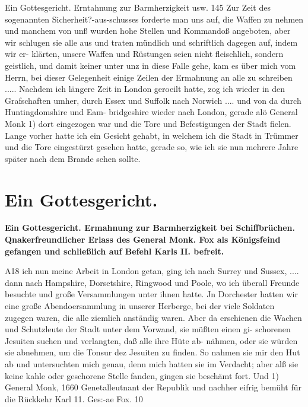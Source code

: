 Ein Gottesgericht. Erntahnung zur Barmherzigkeit usw. 145
Zur Zeit des sogenannten Sicherheit?-aus-schusses forderte man uns
auf, die Waffen zu nehmen und manchem von unß wurden hohe
Stellen und Kommandoß angeboten, aber wir schlugen sie alle aus
und traten mündlich und schriftlich dagegen auf, indem wir er-
klärten, unsere Waffen und Rüstungen seien nicht fleischlich, sondern
geistlich, und damit keiner unter unz in diese Falle gehe, kam es
über mich vom Herrn, bei dieser Gelegenheit einige Zeilen der
Ermahnung an alle zu schreiben .....
Nachdem ich längere Zeit in London geroeilt hatte, zog ich
wieder in den Grafschaften umher, durch Essex und Suffolk nach
Norwich .... und von da durch Huntingdomshire und Eam-
bridgeshire wieder nach London, gerade alö General Monk 1) dort
eingezogen war und die Tore und Befestigungen der Stadt
fielen. Lange vorher hatte ich ein Gesicht gehabt, in welchem
ich die Stadt in Trümmer und die Tore eingestürzt gesehen
hatte, gerade so, wie ich sie nun mehrere Jahre später nach dem
Brande sehen sollte.


\chapter[Ein Gottesgericht.]{Ein Gottesgericht.}

\begin{center}
\textbf{Ein Gottesgericht. Ermahnung zur Barmherzigkeit bei 
Schiffbrüchen. Qnakerfreundlicher Erlass des General Monk. 
Fox als Königsfeind
gefangen und schließlich auf Befehl Karls II. befreit.}
\end{center}


A18 ich nun meine Arbeit in London getan, ging ich nach
Surrey und Sussex, .... dann nach Hampshire, Dorsetshire,
Ringwood und Poole, wo ich überall Freunde besuchte und große
Versammlungen unter ihnen hatte.
Jn Dorchester hatten wir eine große Abendoersammlung in
unserer Herberge, bei der viele Soldaten zugegen waren, die alle
ziemlich anständig waren. Aber da erschienen die Wachen und
Schutzleute der Stadt unter dem Vorwand, sie müßten einen gi-
schorenen Jesuiten suchen und verlangten, daß alle ihre Hüte ab-
nähmen, oder sie würden sie abnehmen, um die Tonsur dez Jesuiten
zu finden. So nahmen sie mir den Hut ab und untersuchten
mich genau, denn mich hatten sie im Verdacht; aber alß sie keine
kahle oder geschorene Stelle fanden, gingen sie beschämt fort. Und
1) General Monk, 1660 Genetalleutnant der Republik und nachher eifrig
bemüht für die Rückkehr Karl 11.
Ges:-ae Fox. 10


